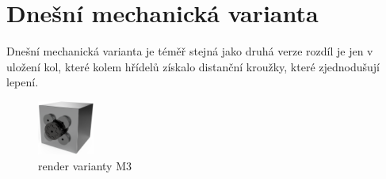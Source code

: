 \section*{Dnešní mechanická varianta}

Dnešní mechanická varianta je téměř stejná jako druhá verze rozdíl je jen v uložení kol, které kolem hřídelů získalo distanční kroužky, které
zjednodušují lepení. 

\begin{figure}[htbp]
    \centering
    \includegraphics[width=70]{kapitoly/obrazky/M3/predni_render.png}
    \caption{render varianty M3}
    \label{fig:M3-render}
\end{figure}
